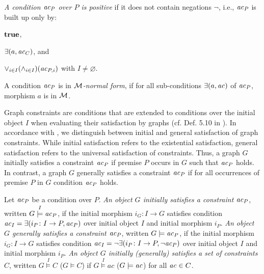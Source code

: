 \begin{definition}
\label{def:sec-gc-gc:cond_pos}
\emph{A condition $\mathit{ac}_P$ over $P$ is positive} if it does not contain negations $\neg$, i.e., $\mathit{ac}_P$ is built up only by:
\begin{enumerate*}
\item $\textbf{true}$,
\item $\exists(a,\mathit{ac}_C)$, and
\item $\vee_{i \in I} (\wedge_{i \in I}) (\mathit{ac}_{P,i})$ with $I \neq \varnothing$.
\envEndMarker
\end{enumerate*}
\end{definition}

\begin{definition}
A condition $\mathit{ac}_P$ is in \emph{${\cal M}$-normal form}, if for all sub-conditions $\exists(a,\mathit{ac})$ of $\mathit{ac}_P$, morphism $a$ is in ${\cal M}$.
\envEndMarker
\end{definition}

Graph constraints are conditions that are extended to conditions over the initial object $I$ when evaluating their satisfaction by graphs (cf. Def. 5.10 in \cite{FAGT2}).
In accordance with \cite{DBLP:journals/corr/abs-1209-1436}, we distinguish between initial and general satisfaction of graph constraints.
While initial satisfaction refers to the existential satisfaction, general satisfaction refers to the universal satisfaction of constraints.
Thus, a graph $G$ initially satisfies a constraint $\mathit{ac}_P$ if premise $P$ occurs in $G$ such that $\mathit{ac}_P$ holds.
In contrast, a graph $G$ generally satisfies a constraint $\mathit{ac}_P$ if for all occurrences of premise $P$ in $G$ condition $\mathit{ac}_P$ holds.

\begin{definition}
\label{def:constr_sat}
Let $\mathit{ac}_P$ be a condition over $P$.
\emph{An object $G$ initially satisfies a constraint $\mathit{ac}_P$}, written $G \stackrel{I}{\models} \mathit{ac}_P$, if the initial morphism $i_G\colon I \to G$ satisfies condition $\mathit{ac}_I=\exists(i_P\colon I \to P,\mathit{ac}_P)$ over initial object $I$ and initial morphism $i_P$.
\emph{An object $G$ generally satisfies a constraint $\mathit{ac}_P$}, written $G \models \mathit{ac}_P$, if the initial morphism $i_G\colon I \to G$ satisfies condition $\mathit{ac}_I=\neg\exists(i_P\colon I \to P,\neg\mathit{ac}_P)$ over initial object $I$ and initial morphism $i_P$.
\emph{An object $G$ initially (generally) satisfies a set of constraints $C$}, written $G \stackrel{I}{\models} C$ ($G \models C$) if $G \stackrel{I}{\models} ac$ ($G \models \mathit{ac}$) for all $\mathit{ac} \in C$.
\envEndMarker
\end{definition}

